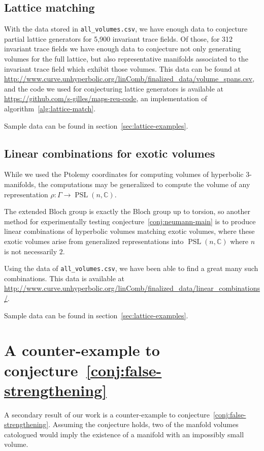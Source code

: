 \documentclass[10pt]{amsart}
\numberwithin{equation}{theorem}
\theoremstyle{definition}
\newcommand{\PSL}{\operatorname{PSL}}
\newcommand{\codebit}[1]{\texttt{#1}}
\begin{document}
\subsection{Lattice matching}

With the data stored in \codebit{all\_volumes.csv}, we have enough
data to conjecture partial lattice generators for 5,900 invariant
trace fields. Of those, for 312 invariant trace fields we have
enough data to conjecture not only generating volumes for the full
lattice, but also representative manifolds associated to the invariant
trace field which exhibit those volumes. This data can be found at
\url{http://www.curve.unhyperbolic.org/linComb/finalized_data/volume_spans.csv},
and the code we used for conjecturing lattice generators is available
at \url{https://github.com/s-gilles/maps-reu-code}, an implementation
of algorithm~\ref{alg:lattice-match}.

Sample data can be found in section~\ref{sec:lattice-examples}.

\subsection{Linear combinations for exotic volumes} While we used the
Ptolemy coordinates for computing volumes of hyperbolic 3-manifolds,
the computations may be generalized to compute the volume of any
representation $\rho: \Gamma \to \PSL(n, \mathbb{C})$.

The extended Bloch group is exactly the Bloch group up
to torsion, so another method for experimentally testing
conjecture~\ref{conj:neumann-main} is to produce linear combinations of
hyperbolic volumes matching exotic volumes, where these exotic volumes
arise from generalized representations into $\PSL(n,\mathbb{C})$ where
$n$ is not necessarily $2$.

Using the data of \codebit{all\_volumes.csv}, we have been able
to find a great many such combinations.  This data is available at
\url{http://www.curve.unhyperbolic.org/linComb/finalized_data/linear_combinations/}.

Sample data can be found in section~\ref{sec:lattice-examples}.

\section{A counter-example to
  conjecture~\ref{conj:false-strengthening}}

\label{sec:strengthening-counterexample} A secondary result of our work
is a counter-example to conjecture~\ref{conj:false-strengthening}.
Assuming the conjecture holds, two of the manfold volumes catologued
would imply the existence of a manifold with an impossibly small volume.
\end{document}
